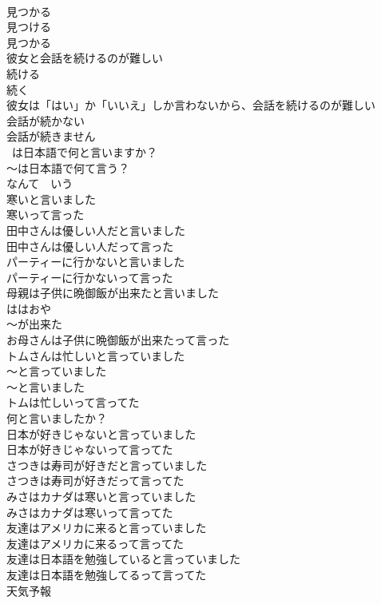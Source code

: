 \documentclass[8pt]{extreport}
\begin{document}
\begin{CJK}{UTF8}{min}
\\	見つかる	
\\	見つける 
\\	見つかる 
\\	彼女と会話を続けるのが難しい	
\\	続ける 
\\	続く 
\\	彼女は「はい」か「いいえ」しか言わないから、会話を続けるのが難しい	
\\	会話が続かない	
\\	会話が続きません	
\\	~は日本語で何と言いますか？	
\\	～は日本語で何て言う？	
\\	なんて　いう
\\	寒いと言いました	
\\	寒いって言った	
\\	田中さんは優しい人だと言いました	
\\	田中さんは優しい人だって言った	
\\	パーティーに行かないと言いました	
\\	パーティーに行かないって言った	
\\	母親は子供に晩御飯が出来たと言いました	
\\	ははおや
\\	～が出来た 
\\	お母さんは子供に晩御飯が出来たって言った	
\\	トムさんは忙しいと言っていました	
\\	～と言っていました 
\\	～と言いました 
\\	トムは忙しいって言ってた	
\\	何と言いましたか？	
\\	日本が好きじゃないと言っていました	
\\	日本が好きじゃないって言ってた	
\\	さつきは寿司が好きだと言っていました	
\\	さつきは寿司が好きだって言ってた	
\\	みさはカナダは寒いと言っていました	
\\	みさはカナダは寒いって言ってた	
\\	友達はアメリカに来ると言っていました	
\\	友達はアメリカに来るって言ってた	
\\	友達は日本語を勉強していると言っていました	
\\	友達は日本語を勉強してるって言ってた	
\\	天気予報	

\end{CJK}
\end{document}

